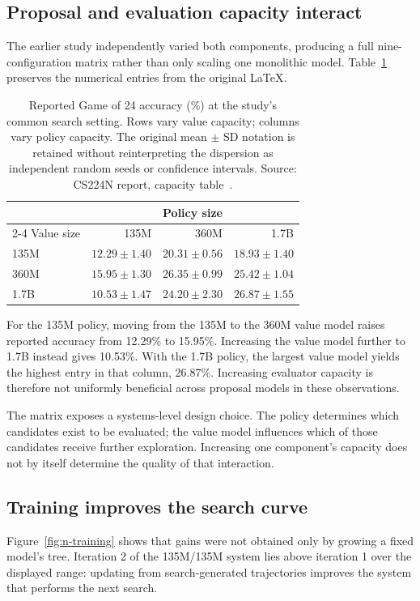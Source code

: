 \documentclass[11pt,letterpaper]{article}
\begin{document}
\subsection{Proposal and evaluation capacity interact}
The earlier study independently varied both components, producing a full nine-configuration matrix rather than only scaling one monolithic model. Table~\ref{tab:capacity} preserves the numerical entries from the original LaTeX.

\begin{table}[H]
\centering
\begin{tabular}{@{}lrrr@{}}
\toprule
 & \multicolumn{3}{c}{Policy size} \\
\cmidrule(lr){2-4}
Value size & 135M & 360M & 1.7B \\
\midrule
135M & $12.29\pm1.40$ & $20.31\pm0.56$ & $18.93\pm1.40$ \\
360M & $15.95\pm1.30$ & $26.35\pm0.99$ & $25.42\pm1.04$ \\
1.7B & $10.53\pm1.47$ & $24.20\pm2.30$ & $26.87\pm1.55$ \\
\bottomrule
\end{tabular}
\caption{Reported Game of 24 accuracy (\%) at the study's common search setting. Rows vary value capacity; columns vary policy capacity. The original mean $\pm$ SD notation is retained without reinterpreting the dispersion as independent random seeds or confidence intervals. Source: CS224N report, capacity table~\cite{originaln}.}
\label{tab:capacity}
\end{table}

For the 135M policy, moving from the 135M to the 360M value model raises reported accuracy from 12.29\% to 15.95\%. Increasing the value model further to 1.7B instead gives 10.53\%. With the 1.7B policy, the largest value model yields the highest entry in that column, 26.87\%. Increasing evaluator capacity is therefore not uniformly beneficial across proposal models in these observations.

The matrix exposes a systems-level design choice. The policy determines which candidates exist to be evaluated; the value model influences which of those candidates receive further exploration. Increasing one component's capacity does not by itself determine the quality of that interaction.

\subsection{Training improves the search curve}
Figure~\ref{fig:n-training} shows that gains were not obtained only by growing a fixed model's tree. Iteration 2 of the 135M/135M system lies above iteration 1 over the displayed range: updating from search-generated trajectories improves the system that performs the next search.
\end{document}
